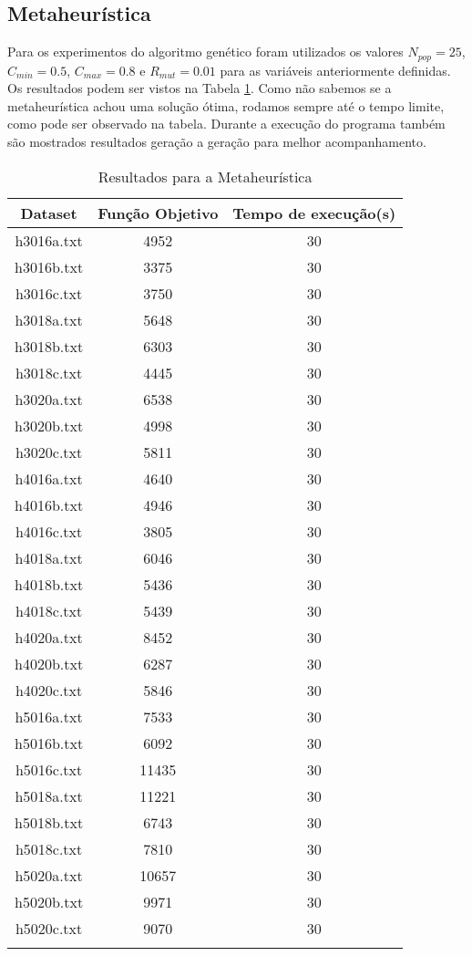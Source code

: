 \documentclass[a4paper,11pt]{article}
\begin{document}
\subsection{Metaheurística}
Para os experimentos do algoritmo genético foram utilizados os valores
$N_{pop} = 25$, $C_{min} = 0.5$, $C_{max} = 0.8$ e $R_{mut} = 0.01$
para as variáveis anteriormente definidas. Os resultados podem ser vistos na Tabela \ref{meta}.
Como não sabemos se a metaheurística achou uma solução ótima, rodamos sempre até o tempo limite,
como pode ser observado na tabela.
Durante a execução do programa também são mostrados resultados geração a geração para melhor acompanhamento.

\begin{longtable}{c c c}
  Dataset & Função Objetivo & Tempo de execução(s) \\
  \hline
  \endhead
  h3016a.txt & 4952  & 30 \\
  h3016b.txt & 3375  & 30 \\
  h3016c.txt & 3750  & 30 \\
  h3018a.txt & 5648  & 30 \\
  h3018b.txt & 6303  & 30 \\
  h3018c.txt & 4445  & 30 \\
  h3020a.txt & 6538  & 30 \\
  h3020b.txt & 4998  & 30 \\
  h3020c.txt & 5811  & 30 \\
  h4016a.txt & 4640  & 30 \\
  h4016b.txt & 4946  & 30 \\
  h4016c.txt & 3805  & 30 \\
  h4018a.txt & 6046  & 30 \\
  h4018b.txt & 5436  & 30 \\
  h4018c.txt & 5439  & 30 \\
  h4020a.txt & 8452  & 30 \\
  h4020b.txt & 6287  & 30 \\
  h4020c.txt & 5846  & 30 \\
  h5016a.txt & 7533  & 30 \\
  h5016b.txt & 6092  & 30 \\
  h5016c.txt & 11435 & 30 \\
  h5018a.txt & 11221 & 30 \\
  h5018b.txt & 6743  & 30 \\
  h5018c.txt & 7810  & 30 \\
  h5020a.txt & 10657 & 30 \\
  h5020b.txt & 9971  & 30 \\
  h5020c.txt & 9070  & 30 \\
  \caption{Resultados para a Metaheurística}
  \label{meta}
\end{longtable}
\end{document}
